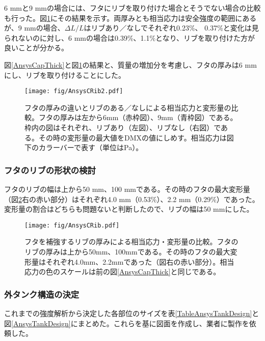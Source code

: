 \documentclass[11pt]{jreport}
\newcommand{\figref}[1]{図\ref{#1}}
\newcommand{\tabref}[1]{表\ref{#1}}
\begin{document}
6 mmと9 mmの場合には、フタにリブを取り付けた場合とそうでない場合の比較も行った。\figref{AnsysCRib2}にその結果を示す。両厚みとも相当応力は安全強度の範囲にあるが、9 mmの場合、$\Delta L/L$はリブあり／なしでそれぞれ0.23\%、 0.37\%と変化は見られないのに対し、6 mmの場合は0.39\%、1.1\%となり、リブを取り付けた方が良いことが分かる。

\figref{AnsysCapThick}と\figref{AnsysCRib2}の結果と、質量の増加分を考慮し、フタの厚みは6 mmにし、リブを取り付けることにした。

\begin{figure}[htbp]
\centering
\texttt{[image: fig/AnsysCRib2.pdf]}
\caption[フタの厚みの違いとリブのある／なしよる相当応力と変形量の比較]{フタの厚みの違いとリブのある／なしによる相当応力と変形量の比較。フタの厚みは左から6mm（赤枠図）、9mm（青枠図）である。枠内の図はそれぞれ、リブあり（左図）、リブなし（右図）である。その時の変形量の最大値をDMXの値にしめす。相当応力は図下のカラーバーで表す（単位はPa）。}
\label{AnsysCRib2}
\end{figure}


\subsubsection{フタのリブの形状の検討}
フタのリブの幅は上から50 mm、100 mmである。その時のフタの最大変形量（\figref{AnsysCRib}右の赤い部分）はそれぞれ4.0 mm（0.53\%）、2.2 mm（0.29\%）であった。変形量の割合はどちらも問題ないと判断したので、リブの幅は50 mmにした。

\begin{figure}[!h]
\centering
\texttt{[image: fig/AnsysCRib.pdf]}
\caption[フタを補強するリブの厚みによる相当応力・変形量の比較]{フタを補強するリブの厚みによる相当応力・変形量の比較。フタのリブの厚みは上から50mm、100mmである。その時のフタの最大変形量はそれぞれ4.0mm、2.2mmであった（図右の赤い部分）。相当応力の色のスケールは前の\figref{AnsysCapThick}と同じである。}
\label{AnsysCRib}
\end{figure}

\newpage
\subsubsection{外タンク構造の決定}
これまでの強度解析から決定した各部位のサイズを\tabref{TableAnsysTankDesign}と\figref{AnsysTankDesign}にまとめた。これらを基に図面を作成し、業者に製作を依頼した。
\end{document}
